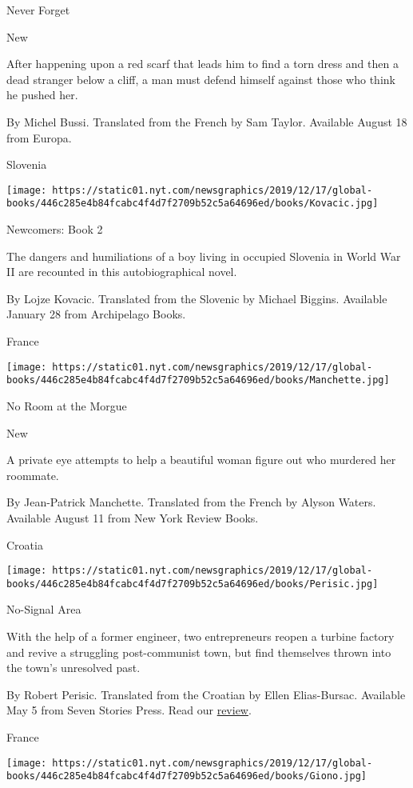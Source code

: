 Never Forget

New

After happening upon a red scarf that leads him to find a torn dress and
then a dead stranger below a cliff, a man must defend himself against
those who think he pushed her.

 By Michel Bussi. Translated from the French by Sam Taylor. Available
August 18 from Europa.

Slovenia

\texttt{[image: https://static01.nyt.com/newsgraphics/2019/12/17/global-books/446c285e4b84fcabc4f4d7f2709b52c5a64696ed/books/Kovacic.jpg]}

Newcomers: Book 2

The dangers and humiliations of a boy living in occupied Slovenia in
World War II are recounted in this autobiographical novel.

 By Lojze Kovacic. Translated from the Slovenic by Michael Biggins.
Available January 28 from Archipelago Books.

France

\texttt{[image: https://static01.nyt.com/newsgraphics/2019/12/17/global-books/446c285e4b84fcabc4f4d7f2709b52c5a64696ed/books/Manchette.jpg]}

No Room at the Morgue

New

A private eye attempts to help a beautiful woman figure out who murdered
her roommate.

 By Jean-Patrick Manchette. Translated from the French by Alyson Waters.
Available August 11 from New York Review Books.

Croatia

\texttt{[image: https://static01.nyt.com/newsgraphics/2019/12/17/global-books/446c285e4b84fcabc4f4d7f2709b52c5a64696ed/books/Perisic.jpg]}

No-Signal Area

With the help of a former engineer, two entrepreneurs reopen a turbine
factory and revive a struggling post-communist town, but find themselves
thrown into the town's unresolved past.

 By Robert Perisic. Translated from the Croatian by Ellen Elias-Bursac.
Available May 5 from Seven Stories Press. Read our
\href{https://www.nytimes.com/2020/04/28/books/review/robert-perisic-no-signal-area.html}{review}.

France

\texttt{[image: https://static01.nyt.com/newsgraphics/2019/12/17/global-books/446c285e4b84fcabc4f4d7f2709b52c5a64696ed/books/Giono.jpg]}

